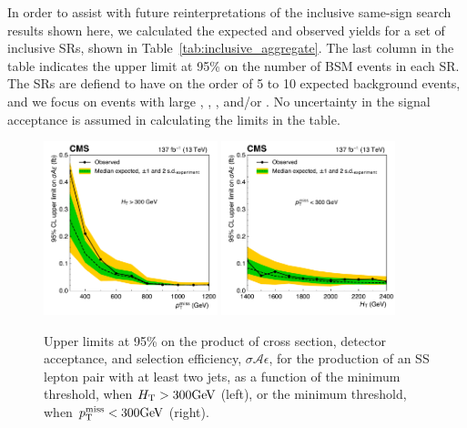In order to assist with future reinterpretations of the inclusive same-sign
search results shown here, we calculated the expected and observed yields for
a set of inclusive SRs, shown in Table~\ref{tab:inclusive_aggregate}. The
last column in the table indicates the upper limit at 95\% \CL on the number
of BSM events in each SR. The SRs are defiend to have on the order of 5 to 10
expected background events, and we focus on events with large \HT, \ptmiss,
\Nbjets, and/or \Njets. No uncertainty in the signal acceptance is assumed in
calculating the limits in the table.




\begin{figure}[!hbtp]
\centering
\includegraphics[width=0.45\textwidth]{figs/ssp/scan_milimits_met.pdf}
\includegraphics[width=0.45\textwidth]{figs/ssp/scan_milimits_ht.pdf}
\caption{Upper limits at 95\% \CL on the product of cross section, detector acceptance, and selection efficiency, $\sigma \! \mathcal{A} \epsilon$,
for the production of an SS lepton pair with at least two jets, as a function of the minimum \ptmiss threshold, when $H_{\mathrm{T}}>300\text{GeV}$ (left), or the minimum \HT threshold, when $p_{\mathrm{T}}^\text{miss}<300\text{GeV}$ (right).
    }
\label{fig:milimits}
\end{figure}

